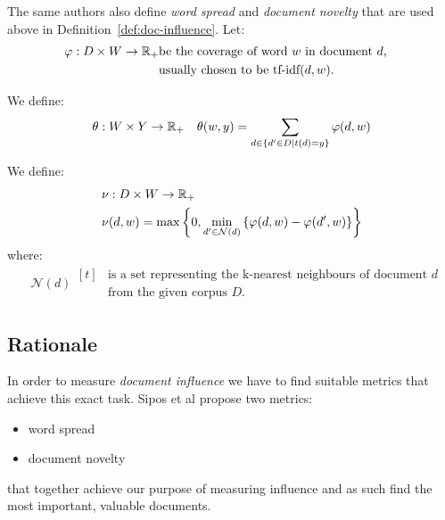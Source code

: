 The same authors \cite{sipos2012temporal} also define \emph{word spread} and
\emph{document novelty} that are used above in
Definition~\ref{def:doc-influence}.
Let:
\begin{align*}
  &\varphi : D \times W \to \mathbb{R}_+
  \begin{aligned}[t]
    &\text{be the coverage of word \(w\) in document \(d\),} \\
    &\text{usually chosen to be tf-idf\((d, w)\).}
  \end{aligned}
\end{align*}

\begin{definition}
  \label{def:word-spread}
  We define:
  \begin{align*}
    &\theta : W \times Y \to \mathbb{R}_+
    &\theta(w, y) = \sum_{d \in \{d' \in D | t(d) = y\}} \varphi(d, w)
  \end{align*}
\end{definition}

\begin{definition}
  \label{def:doc-novelty}
  We define:
  \begin{align*}
    &\nu : D \times W \to \mathbb{R}_+ \\
    &\nu(d, w) = \max \left\{ 0, \min_{d' \in \mathcal{N}(d)}
      \left\{ \varphi(d, w) - \varphi(d', w) \right\} \right\}
  \end{align*}
  where:
  \begin{align*}
    &\mathcal{N}(d)
    \begin{aligned}[t]
      &\text{is a set representing the k-nearest neighbours of
    document \(d\)} \\
      &\text{from the given corpus \(D\).}
    \end{aligned}
  \end{align*}
\end{definition}

\subsection{Rationale}

In order to measure \emph{document influence} we have to find suitable metrics
that achieve this exact task. Sipos et al \cite{sipos2012temporal} propose two
metrics:
\begin{itemize}
  \item word spread
  \item document novelty
\end{itemize}
that together achieve our purpose of measuring influence and as such find the
most important, valuable documents.

